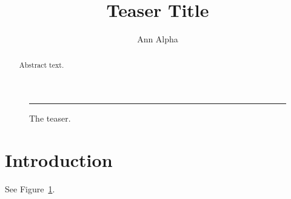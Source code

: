 \documentclass{article}
\begin{document}
\title{Teaser Title}
\author{Ann Alpha}
\maketitle
\begin{figure}[H]
  \centering
  \rule{4cm}{1cm}
  \caption{The teaser.}\label{fig:teaser}
\end{figure}
\begin{abstract}
Abstract text.
\end{abstract}
\section{Introduction}
See Figure~\ref{fig:teaser}.
\end{document}

